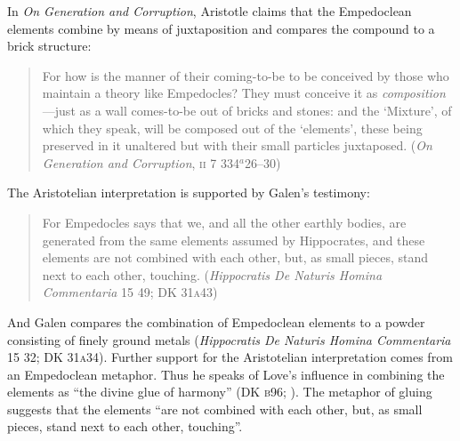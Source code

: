 In \emph{On Generation and Corruption}, Aristotle claims that the Empedoclean elements combine by means of juxtaposition and compares the compound to a brick structure:
\begin{quote}
    For how is the manner of their coming-to-be to be conceived by those who maintain a theory like Empedocles? They must conceive it as \emph{composition}---just as a wall comes-to-be out of bricks and stones: and the `Mixture', of which they speak, will be composed out of the `elements', these being preserved in it unaltered but with their small particles juxtaposed. (\emph{On Generation and Corruption}, \textsc{ii} 7 334\( ^{a} \)26--30)
\end{quote}
The Aristotelian interpretation is supported by Galen's testimony:
\begin{quote}
     For Empedocles says that we, and all the other earthly bodies, are generated from the same elements assumed by Hippocrates, and these elements are not combined with each other, but, as small pieces, stand next to each other, touching. (\emph{Hippocratis De Naturis Homina Commentaria} 15 49; DK 31\textsc{a}43)
\end{quote}
And Galen compares the combination of Empedoclean elements to a powder consisting of finely ground metals (\emph{Hippocratis De Naturis Homina Commentaria} 15 32; DK 31\textsc{a}34). Further support for the Aristotelian interpretation comes from an Empedoclean metaphor. Thus he speaks of Love's influence in combining the elements as ``the divine glue of harmony'' (DK \textsc{b}96; \citealt[62 245]{Inwood:2001ve}). The metaphor of gluing suggests that the elements ``are not combined with each other, but, as small pieces, stand next to each other, touching''.

